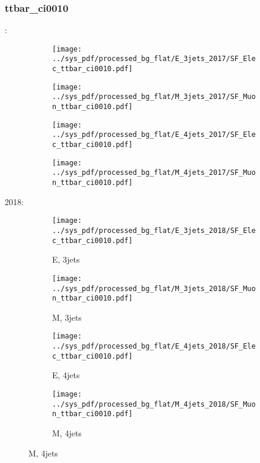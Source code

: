 \documentclass{beamer}
\begin{document}
\begin{frame}
\frametitle{ttbar_ci0010}
\fontsize{5}{1}:
\begin{figure}
\centering
\begin{subfigure}[b]{0.24\textwidth}
\texttt{[image: ../sys\_pdf/processed\_bg\_flat/E\_3jets\_2017/SF\_Elec\_ttbar\_ci0010.pdf]}
\end{subfigure}
\begin{subfigure}[b]{0.24\textwidth}
\texttt{[image: ../sys\_pdf/processed\_bg\_flat/M\_3jets\_2017/SF\_Muon\_ttbar\_ci0010.pdf]}
\end{subfigure}
\begin{subfigure}[b]{0.24\textwidth}
\texttt{[image: ../sys\_pdf/processed\_bg\_flat/E\_4jets\_2017/SF\_Elec\_ttbar\_ci0010.pdf]}
\end{subfigure}
\begin{subfigure}[b]{0.24\textwidth}
\texttt{[image: ../sys\_pdf/processed\_bg\_flat/M\_4jets\_2017/SF\_Muon\_ttbar\_ci0010.pdf]}
\end{subfigure}
\end{figure}
2018:
\begin{figure}
\centering
\begin{subfigure}[b]{0.24\textwidth}
\texttt{[image: ../sys\_pdf/processed\_bg\_flat/E\_3jets\_2018/SF\_Elec\_ttbar\_ci0010.pdf]}
\captionsetup{font=tiny}
\caption{E, 3jets}
\end{subfigure}
\begin{subfigure}[b]{0.24\textwidth}
\texttt{[image: ../sys\_pdf/processed\_bg\_flat/M\_3jets\_2018/SF\_Muon\_ttbar\_ci0010.pdf]}
\captionsetup{font=tiny}
\caption{M, 3jets}
\end{subfigure}
\begin{subfigure}[b]{0.24\textwidth}
\texttt{[image: ../sys\_pdf/processed\_bg\_flat/E\_4jets\_2018/SF\_Elec\_ttbar\_ci0010.pdf]}
\captionsetup{font=tiny}
\caption{E, 4jets}
\end{subfigure}
\begin{subfigure}[b]{0.24\textwidth}
\texttt{[image: ../sys\_pdf/processed\_bg\_flat/M\_4jets\_2018/SF\_Muon\_ttbar\_ci0010.pdf]}
\captionsetup{font=tiny}
\caption{M, 4jets}
\end{subfigure}
\end{figure}
\end{frame}
\end{document}
